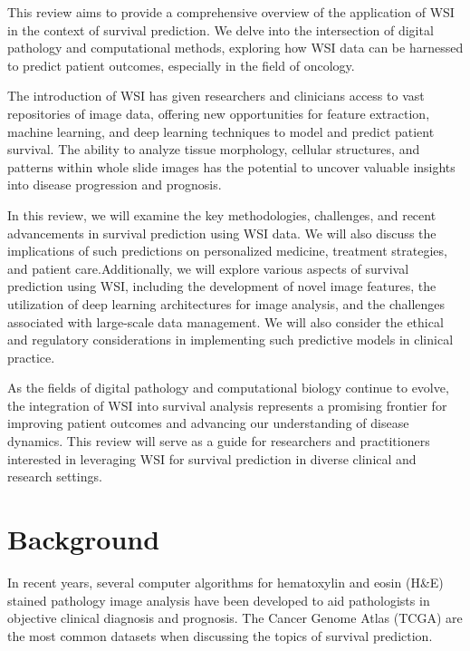 \documentclass[journal,twoside,web]{ieeecolor}
\begin{document}
This review aims to provide a comprehensive overview of the application of WSI in the context of survival prediction. We delve into the intersection of digital pathology and computational methods, exploring how WSI data can be harnessed to predict patient outcomes, especially in the field of oncology.

The introduction of WSI has given researchers and clinicians access to vast repositories of image data, offering new opportunities for feature extraction, machine learning, and deep learning techniques to model and predict patient survival. The ability to analyze tissue morphology, cellular structures, and patterns within whole slide images has the potential to uncover valuable insights into disease progression and prognosis.

In this review, we will examine the key methodologies, challenges, and recent advancements in survival prediction using WSI data. We will also discuss the implications of such predictions on personalized medicine, treatment strategies, and patient care.Additionally, we will explore various aspects of survival prediction using WSI, including the development of novel image features, the utilization of deep learning architectures for image analysis, and the challenges associated with large-scale data management.  We will also consider the ethical and regulatory considerations in implementing such predictive models in clinical practice.

As the fields of digital pathology and computational biology continue to evolve, the integration of WSI into survival analysis represents a promising frontier for improving patient outcomes and advancing our understanding of disease dynamics. This review will serve as a guide for researchers and practitioners interested in leveraging WSI for survival prediction in diverse clinical and research settings.

\section{Background}
In recent years, several computer algorithms for hematoxylin and eosin (H\&E) stained pathology image analysis have been developed to aid pathologists in objective clinical diagnosis and prognosis.
The Cancer Genome Atlas (TCGA) are the most common datasets when discussing the topics of survival prediction.
\end{document}
